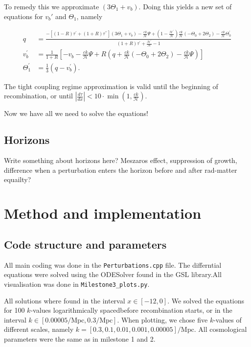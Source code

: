 \documentclass[12pt]{article}
\begin{document}
To remedy this we approximate $(3\Theta_1 + v_b)$. Doing this yields a new set of equations for $v_b'$ and $\Theta_1$, namely 

\begin{equation}\begin{aligned}\label{eq: tight coupling regime dx}
    q &=\frac{-\left[(1-R) \tau^{\prime}+(1+R) \tau^{\prime \prime}\right]\left(3 \Theta_{1}+v_{b}\right)-\frac{c k}{\mathcal{H}} \Psi+\left(1-\frac{\mathcal{H}^{\prime}}{\mathcal{H}}\right) \frac{c k}{\mathcal{H}}\left(-\Theta_{0}+2 \Theta_{2}\right)-\frac{c k}{\mathcal{H}} \Theta_{0}^{\prime}}{(1+R) \tau^{\prime}+\frac{\mathcal{H}^{\prime}}{\mathcal{H}}-1} \\
    v_{b}^{\prime} &=\frac{1}{1+R}\left[-v_{b}-\frac{c k}{\mathcal{H}} \Psi+R\left(q+\frac{c k}{\mathcal{H}}\left(-\Theta_{0}+2 \Theta_{2}\right)-\frac{c k}{\mathcal{H}} \Psi\right)\right] \\
    \Theta_{1}^{\prime} &=\frac{1}{3}\left(q-v_{b}^{\prime}\right).
\end{aligned}\end{equation}

The tight coupling regime approximation is valid until the beginning of recombination, or until $\left|\frac{d \tau}{d x}\right|<10 \cdot \min \left(1, \frac{c k}{\mathcal{H}}\right)$.

Now we have all we need to solve the equations!

\subsection{Horizons}
Write something about horizons here? Meszaros effect, suppression of growth, difference when a perturbation enters the horizon before and after rad-matter equailty?

\section{Method and implementation}
\subsection{Code structure and parameters}
All main coding was done in the \texttt{Perturbations.cpp} file. The differntial equations were solved using the ODESolver found in the GSL library.All visualisation was done in \texttt{Milestone3\_plots.py}. 

All solutions where found in the interval $x\in[-12,0]$. We solved the equations for 100 $k$-values logarithmically spacedbefore recombination starts, or  in the interval $k\in[0.00005/\mathrm{Mpc}, 0.3/\mathrm{Mpc}]$. When plotting, we chose five $k$-values of different scales, namely $k=[0.3, 0.1,0.01,0.001,0.00005]/\mathrm{Mpc}$. All cosmological parameters were the same as in milestone 1 and 2. 
\end{document}
